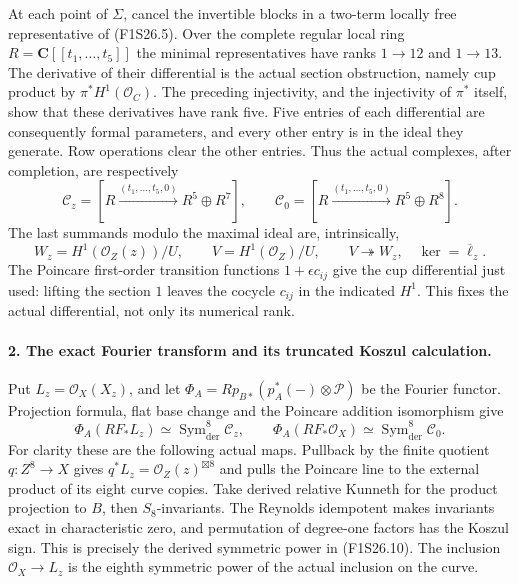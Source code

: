 At each point of $\Sigma$, cancel the invertible blocks in a
two-term locally free representative of (F1S26.5). Over the
complete regular local ring $R=\mathbf C[[t_1,\ldots,t_5]]$
the minimal representatives have ranks $1\to12$ and $1\to13$.
The derivative of their differential is the actual section
obstruction, namely cup product by $\pi^*H^1(\mathcal O_C)$.
The preceding injectivity, and the injectivity of $\pi^*$ itself,
show that these derivatives have rank five. Five entries of
each differential are consequently formal parameters, and every
other entry is in the ideal they generate. Row operations clear
the other entries. Thus the actual complexes, after completion,
are respectively
\[
 \mathcal C_z=[R\xrightarrow{(t_1,\ldots,t_5,0)}R^5\oplus R^7],
 \qquad
 \mathcal C_0=[R\xrightarrow{(t_1,\ldots,t_5,0)}R^5\oplus R^8].
 \tag{F1S26.8}
\]
The last summands modulo the maximal ideal are, intrinsically,
\[
 W_z=H^1(\mathcal O_Z(z))/U,\qquad
 V=H^1(\mathcal O_Z)/U,
 \qquad V\twoheadrightarrow W_z,\quad\ker=\overline\ell_z.
 \tag{F1S26.9}
\]
The Poincare first-order transition functions $1+\epsilon c_{ij}$
give the cup differential just used: lifting the section $1$
leaves the cocycle $c_{ij}$ in the indicated $H^1$. This fixes
the actual differential, not only its numerical rank.

\paragraph{2. The exact Fourier transform and its truncated Koszul calculation.}
Put $L_z=\mathcal O_X(X_z)$, and let
$\Phi_A=Rp_{B*}(p_A^*(-)\otimes\mathcal P)$ be the Fourier
functor. Projection formula, flat base change and the Poincare
addition isomorphism give
\[
 \Phi_A(RF_*L_z)\simeq\operatorname{Sym}^8_{\mathrm{der}}\mathcal C_z,
 \qquad
 \Phi_A(RF_*\mathcal O_X)
                  \simeq\operatorname{Sym}^8_{\mathrm{der}}\mathcal C_0.
 \tag{F1S26.10}
\]
For clarity these are the following actual maps. Pullback by the
finite quotient $q:Z^8\to X$ gives
$q^*L_z=\mathcal O_Z(z)^{\boxtimes8}$ and pulls the Poincare
line to the external product of its eight curve copies. Take
derived relative Kunneth for the product projection to $B$,
then $S_8$-invariants. The Reynolds idempotent makes invariants
exact in characteristic zero, and permutation of degree-one
factors has the Koszul sign. This is precisely the derived
symmetric power in (F1S26.10). The inclusion
$\mathcal O_X\to L_z$ is the eighth symmetric power of the
actual inclusion on the curve.


